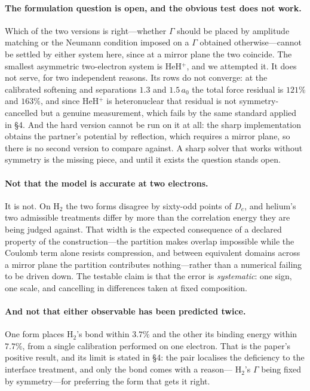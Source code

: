 \documentclass[11pt,a4paper]{article}
\begin{document}
\paragraph{The formulation question is open, and the obvious test does not work.} Which of the two
versions is right---whether $\Gamma$ should be placed by amplitude matching or the Neumann condition
imposed on a $\Gamma$ obtained otherwise---cannot be settled by either system here, since at a
mirror plane the two coincide. The smallest asymmetric two-electron system is HeH$^+$, and we
attempted it. It does not serve, for two independent reasons. Its rows do not converge: at the
calibrated softening and separations $1.3$ and $1.5\,a_0$ the total force residual is $121\%$ and
$163\%$, and since HeH$^+$ is heteronuclear that residual is not symmetry-cancelled but a genuine
measurement, which fails by the same standard applied in \S4. And the hard version cannot be run on
it at all: the sharp implementation obtains the partner's potential by reflection, which requires a
mirror plane, so there is no second version to compare against. A sharp solver that works without
symmetry is the missing piece, and until it exists the question stands open.

\paragraph{Not that the model is accurate at two electrons.} It is not. On H$_2$ the two forms
disagree by sixty-odd points of $D_e$, and helium's two admissible treatments differ by more than
the correlation energy they are being judged against. That width is the expected consequence of a declared property of the
construction---the partition makes overlap impossible while the Coulomb term alone resists
compression, and between equivalent domains across a mirror plane the partition contributes
nothing---rather than a numerical failing to be driven down. The testable claim is that the error is
\emph{systematic}: one sign, one scale, and cancelling in differences taken at fixed composition.

\paragraph{And not that either observable has been predicted twice.} One form places H$_2$'s bond
within $3.7\%$ and the other its binding energy within $7.7\%$, from a single calibration performed
on one electron. That is the paper's positive result, and its limit is stated in \S4: the pair
localises the deficiency to the interface treatment, and only the bond comes with a reason---
H$_2$'s $\Gamma$ being fixed by symmetry---for preferring the form that gets it right.
\end{document}
